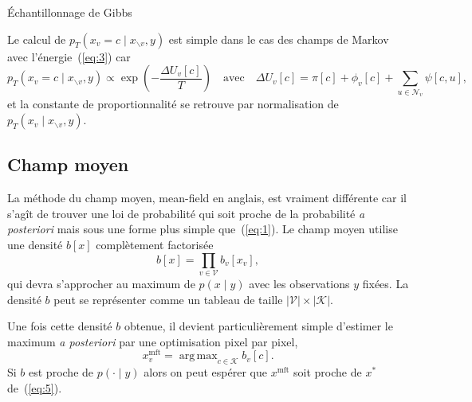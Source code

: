 \documentclass[a4paper,11pt,oneside]{article}
\DeclareMathOperator*{\argmax}{arg\,max}
\begin{document}
\begin{algorithm}
  \caption{Échantillonnage de Gibbs}
  \label{alg:2}
\end{algorithm}

Le calcul de $p_T(x_v=c\mid x_{\backslash v},y)$ est simple
dans le cas des champs de Markov avec l'énergie~(\ref{eq:3})
car
\begin{equation}
  \label{eq:6}
  p_T(x_v=c\mid x_{\backslash v},y)
  \propto
  \exp\left(-\frac{\Delta U_v[c]}T\right)
  \quad\text{avec}\quad
  \Delta U_v[c] = \pi[c] + \phi_v[c]
              + \sum_{u\in\mathcal N_v} \psi[c, u],
\end{equation}
et la constante de proportionnalité se retrouve par
normalisation de $p_T(x_v\mid x_{\backslash v},y)$.


\subsection{Champ moyen}
\label{sec:champ-moyen}

La méthode du champ moyen, \textenglish{mean-field} en
anglais, est vraiment différente car il s'agît de trouver
une loi de probabilité qui soit proche de la probabilité
\emph{a posteriori} mais sous une forme plus simple
que~(\ref{eq:1}). Le champ moyen utilise une densité $b[x]$
complètement factorisée
\begin{equation}
  \label{eq:7}
  b[x] = \prod_{v\in\mathcal V} b_v[x_v],
\end{equation}
qui devra s'approcher au maximum de $p(x\mid y)$ avec les
observations $y$ fixées. La densité $b$ peut se représenter
comme un tableau de taille $|\mathcal V|\times|\mathcal K|$.

Une fois cette densité $b$ obtenue, il devient
particulièrement simple d'estimer le maximum \emph{a
  posteriori} par une optimisation pixel par pixel,
\begin{equation}
  \label{eq:8}
  x_v^\text{mft} = \argmax_{c\in\mathcal K} b_v[c].
\end{equation}
Si $b$ est proche de $p(\cdot\mid y)$ alors on peut espérer
que $x^\text{mft}$ soit proche de $x^*$ de~(\ref{eq:5}).
\end{document}

